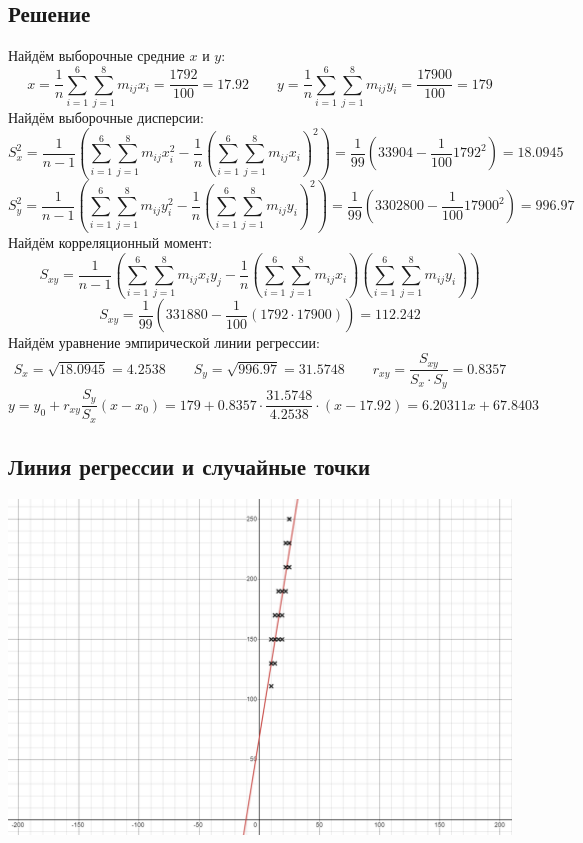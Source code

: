 \documentclass[12pt,a4paper]{report}
\begin{document}
\subsection*{Решение}
Найдём выборочные средние $x$ и $y$:
$$x=\frac{1}{n}\sum_{i=1}^{6}\sum_{j=1}^{8}m_{ij}x_i=\frac{1792}{100}=17.92\qquad y=\frac{1}{n}\sum_{i=1}^{6}\sum_{j=1}^{8}m_{ij}y_i=\frac{17900}{100}=179$$
Найдём выборочные дисперсии:
$$S_x^2=\frac{1}{n-1}(\sum_{i=1}^{6}\sum_{j=1}^{8}m_{ij}x_i^2-\frac{1}{n}(\sum_{i=1}^{6}\sum_{j=1}^{8}m_{ij}x_i)^2)=\frac{1}{99}(33904-\frac{1}{100}1792^2)=18.0945$$
$$S_y^2=\frac{1}{n-1}(\sum_{i=1}^{6}\sum_{j=1}^{8}m_{ij}y_i^2-\frac{1}{n}(\sum_{i=1}^{6}\sum_{j=1}^{8}m_{ij}y_i)^2)=\frac{1}{99}(3302800-\frac{1}{100}17900^2)=996.97$$
Найдём корреляционный момент:
$$S_{xy}=\frac{1}{n-1}(\sum_{i=1}^{6}\sum_{j=1}^{8}m_{ij}x_iy_j-\frac{1}{n}(\sum_{i=1}^{6}\sum_{j=1}^{8}m_{ij}x_i)(\sum_{i=1}^{6}\sum_{j=1}^{8}m_{ij}y_i))$$
$$S_{xy}=\frac{1}{99}(331880-\frac{1}{100}(1792\cdot 17900))=112.242$$
Найдём уравнение эмпирической линии регрессии:
$$S_x=\sqrt{18.0945}=4.2538\qquad S_y=\sqrt{996.97}=31.5748\qquad r_{xy}=\frac{S_{xy}}{S_x\cdot S_y}=0.8357$$
$$y=y_0+r_{xy}\frac{S_y}{S_x}(x-x_0)=179+0.8357\cdot\frac{31.5748}{4.2538}\cdot(x-17.92)=6.20311x+67.8403$$
\subsection*{Линия регрессии и случайные точки}
\begin{center}
	\includegraphics[width=\textwidth]{regression.png}
\end{center}
\end{document}
